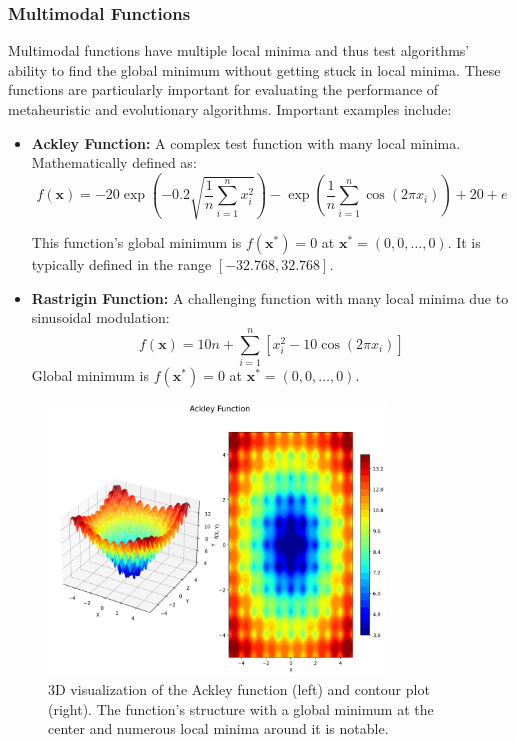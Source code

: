 \subsubsection{Multimodal Functions}

Multimodal functions have multiple local minima and thus test algorithms' ability to find the global minimum without getting stuck in local minima. These functions are particularly important for evaluating the performance of metaheuristic and evolutionary algorithms. Important examples include:

\begin{itemize}
    \item \textbf{Ackley Function:} A complex test function with many local minima. Mathematically defined as:
    \begin{equation}
        f(\mathbf{x}) = -20\exp\left(-0.2\sqrt{\frac{1}{n}\sum_{i=1}^{n}x_i^2}\right) - \exp\left(\frac{1}{n}\sum_{i=1}^{n}\cos(2\pi x_i)\right) + 20 + e
    \end{equation}
    
    This function's global minimum is $f(\mathbf{x}^*) = 0$ at $\mathbf{x}^* = (0, 0, \ldots, 0)$. It is typically defined in the range $[-32.768, 32.768]$.
    
    \item \textbf{Rastrigin Function:} A challenging function with many local minima due to sinusoidal modulation:
    \begin{equation}
        f(\mathbf{x}) = 10n + \sum_{i=1}^{n} \left[ x_i^2 - 10\cos(2\pi x_i) \right]
    \end{equation}
    Global minimum is $f(\mathbf{x}^*) = 0$ at $\mathbf{x}^* = (0, 0, \ldots, 0)$.
\end{itemize}

\begin{figure}[h]
    \centering
    \includegraphics[width=0.8\textwidth]{weeks_new/imgs/ackley_function.png}
    \caption{3D visualization of the Ackley function (left) and contour plot (right). The function's structure with a global minimum at the center and numerous local minima around it is notable.}
    \label{fig:ackley}
\end{figure}

